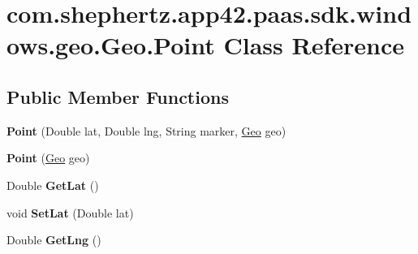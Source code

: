 \hypertarget{classcom_1_1shephertz_1_1app42_1_1paas_1_1sdk_1_1windows_1_1geo_1_1_geo_1_1_point}{\section{com.\+shephertz.\+app42.\+paas.\+sdk.\+windows.\+geo.\+Geo.\+Point Class Reference}
\label{classcom_1_1shephertz_1_1app42_1_1paas_1_1sdk_1_1windows_1_1geo_1_1_geo_1_1_point}
}
\subsection*{Public Member Functions}
\begin{DoxyCompactItemize}
\item 
\hypertarget{classcom_1_1shephertz_1_1app42_1_1paas_1_1sdk_1_1windows_1_1geo_1_1_geo_1_1_point_a96057ca685aa771496335de9a368ccea}{{\bfseries Point} (Double lat, Double lng, String marker, \hyperlink{classcom_1_1shephertz_1_1app42_1_1paas_1_1sdk_1_1windows_1_1geo_1_1_geo}{Geo} geo)}\label{classcom_1_1shephertz_1_1app42_1_1paas_1_1sdk_1_1windows_1_1geo_1_1_geo_1_1_point_a96057ca685aa771496335de9a368ccea}

\item 
\hypertarget{classcom_1_1shephertz_1_1app42_1_1paas_1_1sdk_1_1windows_1_1geo_1_1_geo_1_1_point_a8276720f11cd7a0313c04d5320eef101}{{\bfseries Point} (\hyperlink{classcom_1_1shephertz_1_1app42_1_1paas_1_1sdk_1_1windows_1_1geo_1_1_geo}{Geo} geo)}\label{classcom_1_1shephertz_1_1app42_1_1paas_1_1sdk_1_1windows_1_1geo_1_1_geo_1_1_point_a8276720f11cd7a0313c04d5320eef101}

\item 
\hypertarget{classcom_1_1shephertz_1_1app42_1_1paas_1_1sdk_1_1windows_1_1geo_1_1_geo_1_1_point_af9b0a212005429817f3e13e7fe775bdf}{Double {\bfseries Get\+Lat} ()}\label{classcom_1_1shephertz_1_1app42_1_1paas_1_1sdk_1_1windows_1_1geo_1_1_geo_1_1_point_af9b0a212005429817f3e13e7fe775bdf}

\item 
\hypertarget{classcom_1_1shephertz_1_1app42_1_1paas_1_1sdk_1_1windows_1_1geo_1_1_geo_1_1_point_acc4a584e2171909fddf66f127f70566a}{void {\bfseries Set\+Lat} (Double lat)}\label{classcom_1_1shephertz_1_1app42_1_1paas_1_1sdk_1_1windows_1_1geo_1_1_geo_1_1_point_acc4a584e2171909fddf66f127f70566a}

\item 
\hypertarget{classcom_1_1shephertz_1_1app42_1_1paas_1_1sdk_1_1windows_1_1geo_1_1_geo_1_1_point_a8f4f93a3c1ed263cfada18ca3ee3017a}{Double {\bfseries Get\+Lng} ()}\label{classcom_1_1shephertz_1_1app42_1_1paas_1_1sdk_1_1windows_1_1geo_1_1_geo_1_1_point_a8f4f93a3c1ed263cfada18ca3ee3017a}


\end{DoxyCompactItemize}
